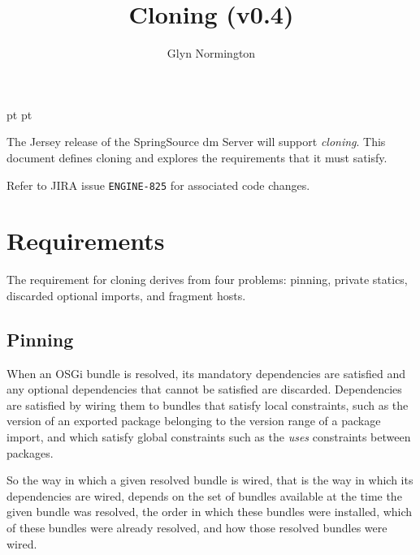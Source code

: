 \documentclass[a4paper,12pt]{article}
\begin{document}
 pt
 pt

\title{Cloning (v0.4)}
\author{Glyn Normington}
\maketitle
\thispagestyle{myheadings}
\setcounter{page}{0}

The Jersey release of the SpringSource dm Server will support \textit{cloning}.
This document defines cloning and explores the requirements that it must satisfy.

Refer to JIRA issue \texttt{ENGINE-825} for associated code changes.
\clearpage
{}
\tableofcontents

\newcommand{\true}{true}
\newcommand{\false}{false}

\clearpage
{}
\section{Requirements}
The requirement for cloning derives from four problems: pinning, private
statics, discarded optional imports, and fragment hosts.

\subsection{Pinning}

When an OSGi bundle is resolved, its mandatory dependencies are satisfied and any
optional dependencies that cannot be satisfied are discarded. Dependencies
are satisfied by wiring them to bundles that satisfy local constraints,
such as the version of an exported package belonging to the version range of a package import, and
which satisfy global constraints such as the \textit{uses} constraints between packages.

So the way in which a given resolved bundle is wired, that is the way in which its
dependencies are wired, depends on
the set of bundles available at the time the given bundle was resolved, the order
in which these bundles were
installed, which of these bundles were already resolved, and how those resolved
bundles were wired.
\end{document}
